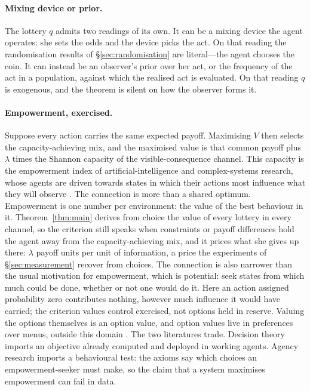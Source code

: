 \documentclass[11pt,a4paper]{article}
\theoremstyle{definition}
\newcommand{\1}{\mathbf 1}
\begin{document}
\paragraph{Mixing device or prior.}
The lottery $q$ admits two readings of its own.  It can be a mixing device the agent operates: she
sets the odds and the device picks the act.  On that reading the randomisation results of
\S\ref{sec:randomisation} are literal---the agent chooses the coin.  It can instead be an
observer's prior over her act, or the frequency of the act in a population, against which the
realised act is evaluated.  On that reading $q$ is exogenous, and the theorem is silent on how the
observer forms it.

\paragraph{Empowerment, exercised.}
Suppose every action carries the same expected payoff.  Maximising $V$ then selects the
capacity-achieving mix, and the maximised value is that common payoff plus $\lambda$ times the
Shannon capacity of the visible-consequence channel.  This capacity is the empowerment index of
artificial-intelligence and complex-systems research, whose agents are driven towards states in
which their actions most influence what they will observe
\cite{KlyubinPolaniNehaniv2005,SalgeGlackinPolani2014}.  The connection is more than a shared
optimum.  Empowerment is one number per environment: the value of the best behaviour in it.
Theorem~\ref{thm:main} derives from choice the value of every lottery in every channel, so the
criterion still speaks when constraints or payoff differences hold the agent away from the
capacity-achieving mix, and it prices what she gives up there: $\lambda$ payoff units per unit of information, a
price the experiments of \S\ref{sec:measurement} recover from choices.  The connection is also
narrower than the usual motivation for empowerment, which is potential: seek states from which
much could be done, whether or not one would do it.  Here an action assigned probability zero
contributes nothing, however much influence it would have carried; the criterion values control
exercised, not options held in reserve.  Valuing the options themselves is an option value, and
option values live in preferences over menus, outside this domain \cite{Kreps1979}.  The two
literatures trade.  Decision theory imports an objective already computed and deployed in working
agents.  Agency research imports a behavioural test: the axioms say which choices an
empowerment-seeker must make, so the claim that a system maximises empowerment can fail in data.
\end{document}
